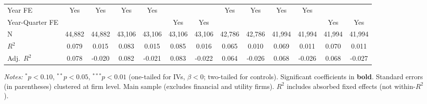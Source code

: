 \begin{landscape}
\begin{table}[H]
\begin{tabular}{lcccccccccccc}
Year FE & Yes & Yes & Yes & Yes &  &  & Yes & Yes & Yes & Yes &  &  \\
Year-Quarter FE &  &  &  &  & Yes & Yes &  &  &  &  & Yes & Yes \\
\midrule
N & 44,882 & 44,882 & 43,106 & 43,106 & 43,106 & 43,106 & 42,786 & 42,786 & 41,994 & 41,994 & 41,994 & 41,994 \\
$R^2$ & 0.079 & 0.015 & 0.083 & 0.015 & 0.085 & 0.016 & 0.065 & 0.010 & 0.069 & 0.011 & 0.070 & 0.011 \\
Adj.~$R^2$ & 0.078 & -0.020 & 0.082 & -0.021 & 0.083 & -0.022 & 0.064 & -0.026 & 0.068 & -0.026 & 0.068 & -0.027 \\
\bottomrule
\end{tabular}
\begin{minipage}{\linewidth}
\vspace{2pt}\scriptsize
\textit{Notes:} $^{*}p<0.10$, $^{**}p<0.05$, $^{***}p<0.01$ (one-tailed for IVs, $\beta < 0$; two-tailed for controls).
 Significant coefficients in \textbf{bold}.
 Standard errors (in parentheses) clustered at firm level.
 Main sample (excludes financial and utility firms).
 $R^2$ includes absorbed fixed effects (not within-$R^2$).
\end{minipage}
\end{table}
\end{landscape}